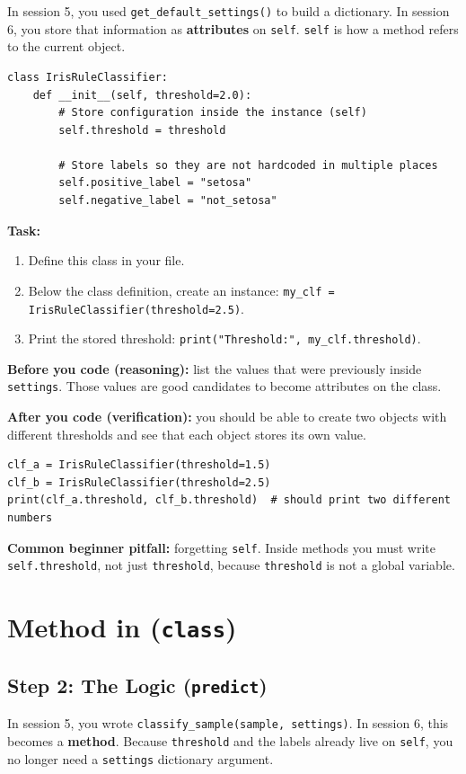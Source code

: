 \noindent
In session 5, you used \texttt{get\_default\_settings()} to build a dictionary.
In session 6, you store that information as \textbf{attributes} on \texttt{self}.
\texttt{self} is how a method refers to the current object.

\begin{verbatim}
class IrisRuleClassifier:
    def __init__(self, threshold=2.0):
        # Store configuration inside the instance (self)
        self.threshold = threshold
        
        # Store labels so they are not hardcoded in multiple places
        self.positive_label = "setosa"
        self.negative_label = "not_setosa"
\end{verbatim}

\noindent
\textbf{Task:}
\begin{enumerate}
    \item Define this class in your file.
    \item Below the class definition, create an instance: \texttt{my\_clf = IrisRuleClassifier(threshold=2.5)}.
    \item Print the stored threshold: \texttt{print("Threshold:", my\_clf.threshold)}.
\end{enumerate}
\noindent
\textbf{Before you code (reasoning):} list the values that were previously inside \texttt{settings}.
Those values are good candidates to become attributes on the class.

\noindent
\textbf{After you code (verification):} you should be able to create two objects with different thresholds and see that each object stores its own value.
\begin{verbatim}
clf_a = IrisRuleClassifier(threshold=1.5)
clf_b = IrisRuleClassifier(threshold=2.5)
print(clf_a.threshold, clf_b.threshold)  # should print two different numbers
\end{verbatim}
\noindent
\textbf{Common beginner pitfall:} forgetting \texttt{self}.
Inside methods you must write \texttt{self.threshold}, not just \texttt{threshold}, because \texttt{threshold} is not a global variable.


\section{Method in (\texttt{class})}

\subsection{Step 2: The Logic (\texttt{predict})}
In session 5, you wrote \texttt{classify\_sample(sample, settings)}.
In session 6, this becomes a \textbf{method}.
Because \texttt{threshold} and the labels already live on \texttt{self}, you no longer need a \texttt{settings} dictionary argument.

